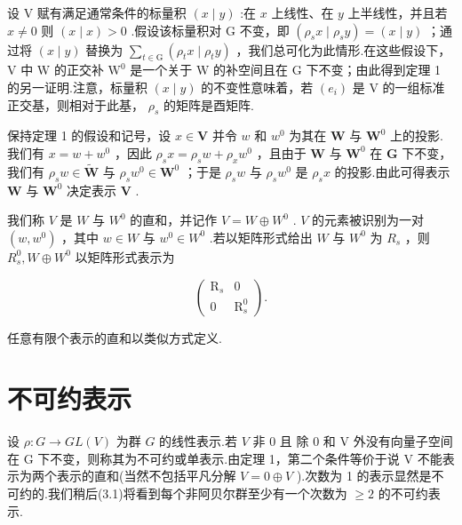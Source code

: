 \begin{remark}
设 \(\mathrm{V}\) 赋有满足通常条件的标量积 \(\left( {x \mid  y}\right)\) :在 \(x\) 上线性、在 \(y\) 上半线性，并且若 \(x \neq  0\) 则 \(\left( {x \mid  x}\right)  > 0\) .假设该标量积对 G 不变，即 \(\left( {{\rho }_{s}x \mid  {\rho }_{s}y}\right)  = \left( {x \mid  y}\right)\) ；通过将 \(\left( {x \mid  y}\right)\) 替换为 \(\mathop{\sum }\limits_{{t \in  \mathrm{G}}}\left( {{\rho }_{t}x \mid  {\rho }_{t}y}\right)\) ，我们总可化为此情形.在这些假设下， \(\mathrm{V}\) 中 \(\mathrm{W}\) 的正交补 \({\mathrm{W}}^{0}\) 是一个关于 \(\mathrm{W}\) 的补空间且在 \(\mathrm{G}\) 下不变；由此得到定理 1 的另一证明.注意，标量积 \(\left( {x \mid  y}\right)\) 的不变性意味着，若 \(\left( {e}_{i}\right)\) 是 \(\mathrm{V}\) 的一组标准正交基，则相对于此基， \({\rho }_{s}\) 的矩阵是酉矩阵.
\end{remark}

保持定理 1 的假设和记号，设 \(x \in  \mathbf{V}\) 并令 \(w\) 和 \({w}^{0}\) 为其在 \(\mathbf{W}\) 与 \({\mathbf{W}}^{0}\) 上的投影.我们有 \(x = w + {w}^{0}\) ，因此 \({\rho }_{s}x = {\rho }_{s}w + {\rho }_{x}{w}^{0}\) ，且由于 \(\mathbf{W}\) 与 \({\mathbf{W}}^{0}\) 在 \(\mathbf{G}\) 下不变，我们有 \({\rho }_{s}w \in  \widetilde{\mathbf{W}}\) 与 \({\rho }_{s}{w}^{0} \in  {\mathbf{W}}^{0}\) ；于是 \({\rho }_{s}w\) 与 \({\rho }_{s}{w}^{0}\) 是 \({\rho }_{s}x\) 的投影.由此可得表示 \(\mathbf{W}\) 与 \({\mathbf{W}}^{0}\) 决定表示 \(\mathbf{V}\) .

我们称 \(V\) 是 \(W\) 与 \({W}^{0}\) 的直和，并记作 \(V = W \oplus  {W}^{0}\) . \(V\) 的元素被识别为一对 \(\left( {w,{w}^{0}}\right)\) ，其中 \(w \in  W\) 与 \({w}^{0} \in  {W}^{0}\) .若以矩阵形式给出 \(W\) 与 \({W}^{0}\) 为 \({R}_{s}\) ，则 \({R}_{s}^{0},W \oplus  {W}^{0}\) 以矩阵形式表示为

\[
\left( \begin{matrix} {\mathrm{R}}_{s} & 0 \\  0 & {\mathrm{R}}_{s}^{0} \end{matrix}\right) .
\]

任意有限个表示的直和以类似方式定义.

\section{不可约表示}

设 \(\rho  : G \rightarrow  {GL}\left( V\right)\) 为群 \(G\) 的线性表示.若 \(V\) 非 0 且 除 0 和 V 外没有向量子空间在 G 下不变，则称其为不可约或单表示.由定理 1，第二个条件等价于说 V 不能表示为两个表示的直和(当然不包括平凡分解 \(V = 0 \oplus  V\) ).次数为 1 的表示显然是不可约的.我们稍后(3.1)将看到每个非阿贝尔群至少有一个次数为 \(\geq  2\) 的不可约表示.

